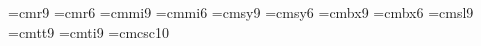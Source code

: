  
%         
 
\font\ninerm=cmr9            \font\sixrm=cmr6
\font\ninei=cmmi9            \font\sixi=cmmi6
\font\ninesy=cmsy9           \font\sixsy=cmsy6
\font\ninebf=cmbx9           \font\sixbf=cmbx6
\font\ninesl=cmsl9           \font\ninett=cmtt9      \font\nineit=cmti9
\font\ninecsc=cmcsc10
 
\ifx\ninepoint\undefined
   \def\ninepoint{\def\rm{\fam0\ninerm} %
       \textfont0=\ninerm  \scriptfont0=\sixrm  \scriptscriptfont0=\fiverm
       \textfont1=\ninei   \scriptfont1=\sixi   \scriptscriptfont1=\fivei
       \textfont2=\ninesy  \scriptfont2=\sixsy  \scriptscriptfont2=\fivesy
       \textfont3=\tenex   \scriptfont3=\tenex  \scriptscriptfont3=\tenex
       \textfont\itfam=\nineit   \def\it{\fam\itfam\nineit}%
       \textfont\slfam=\ninesl   \def\sl{\fam\slfam\ninesl}%
       \textfont\ttfam=\ninett   \def\tt{\fam\ttfam\ninett}%
       \textfont\bffam=\ninebf   \scriptfont\bffam=\sixbf
        \scriptscriptfont\bffam=\fivebf   \def\bf{\fam\bffam\ninebf}%
       \normalbaselineskip=11pt
       \setbox\strutbox=\hbox{\vrule height8pt depth3pt width0pt}%
       \normalbaselines\rm}
   \fi
